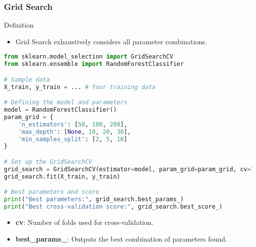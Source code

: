 \documentclass[aspectratio=169]{beamer}
\begin{document}
\begin{frame}[fragile]
    \frametitle{Grid Search}
    \begin{block}{Definition}
        \begin{itemize}
            \item Grid Search exhaustively considers all parameter combinations.
        \end{itemize}
    \end{block}
    
    \begin{lstlisting}[language=Python]
from sklearn.model_selection import GridSearchCV
from sklearn.ensemble import RandomForestClassifier

# Sample data
X_train, y_train = ... # Your training data

# Defining the model and parameters
model = RandomForestClassifier()
param_grid = {
    'n_estimators': [50, 100, 200],
    'max_depth': [None, 10, 20, 30],
    'min_samples_split': [2, 5, 10]
}

# Set up the GridSearchCV
grid_search = GridSearchCV(estimator=model, param_grid=param_grid, cv=3)
grid_search.fit(X_train, y_train)

# Best parameters and score
print("Best parameters:", grid_search.best_params_)
print("Best cross-validation score:", grid_search.best_score_)
    \end{lstlisting}
    
    \begin{itemize}
        \item \textbf{cv}: Number of folds used for cross-validation.
        \item \textbf{best\_params\_}: Outputs the best combination of parameters found.
    \end{itemize}
\end{frame}
\end{document}
